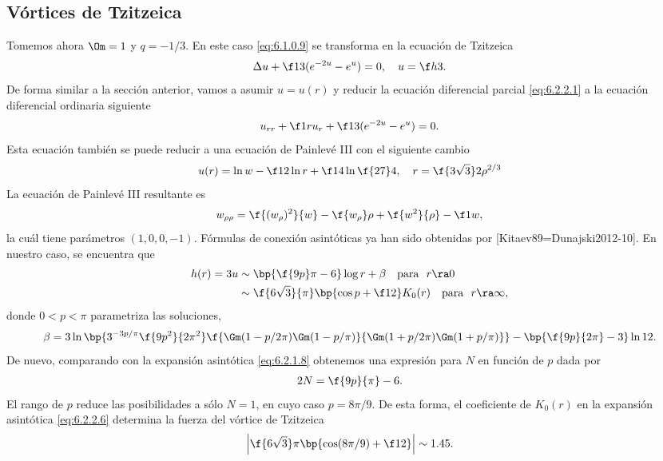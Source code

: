 \subsection{Vórtices de Tzitzeica}

Tomemos ahora $\Om=1$ y $q=-1/3$. En este caso \eqref{eq:6.1.0.9} se transforma en la ecuación de Tzitzeica
\begin{align}
	\Delta u+\f 13(e^{-2u}-e^u) =0, \ \ \ u=\f h3. \label{eq:6.2.2.1}
\end{align}
De forma similar a la sección anterior, vamos a asumir $u=u(r)$ y reducir la ecuación diferencial parcial \eqref{eq:6.2.2.1} a la ecuación diferencial ordinaria siguiente
\begin{align}
	u_{rr}+\f 1r u_r+\f 13(e^{-2u}-e^u) =0.
\end{align}
Esta ecuación también se puede reducir a una ecuación de Painlevé III con el siguiente cambio
\begin{align}
	u(r) = \ln w-\f 12\ln r+\f 14\ln\f{27}4, \ \ \ r=\f{3\sqrt 3}2\rho^{2/3}
\end{align}
La ecuación de Painlevé III resultante es
\begin{align}
	w_{\rho\rho} = \f{(w_\rho)^2}{w}-\f{w_\rho}\rho+\f{w^2}{\rho}-\f 1w,
\end{align}
la cuál tiene parámetros $(1,0,0,-1)$. Fórmulas de conexión asintóticas ya han sido obtenidas por [Kitaev89=Dunajski2012-10]. En nuestro caso, se encuentra que
\begin{align}
	h(r) = 3u&\sim \bp{\f{9p}\pi-6}\log r+\beta \ \ \ \text{para} \ \ r\ra 0 \label{eq:6.2.2.5}\\
	&\sim \f{6\sqrt 3}{\pi}\bp{\cos p+\f 12}K_0(r) \ \ \ \text{para} \ \ r\ra\infty, \label{eq:6.2.2.6}
\end{align}
donde $0<p<\pi$ parametriza las soluciones,
\begin{align}
	\beta = 3\ln\bp{3^{-3p/\pi}\f{9p^2}{2\pi^2}\f{\Gm(1-p/2\pi)\Gm(1-p/\pi)}{\Gm(1+p/2\pi)\Gm(1+p/\pi)}}-\bp{\f{9p}{2\pi}-3}\ln 12.
\end{align}
De nuevo, comparando con la expansión asintótica \eqref{eq:6.2.1.8} obtenemos una expresión para $N$ en función de $p$ dada por
\begin{align}
	2N = \f{9p}{\pi}-6. \label{eq:6.2.2.8}
\end{align}
El rango de $p$ reduce las posibilidades a sólo $N=1$, en cuyo caso $p=8\pi/9$. De esta forma, el coeficiente de $K_0(r)$ en la expansión asintótica \eqref{eq:6.2.2.6} determina la fuerza del vórtice de Tzitzeica
\begin{align}
	\left|\f{6\sqrt 3}\pi\bp{\cos(8\pi/9)+\f 12}\right|\sim 1.45.
\end{align}

